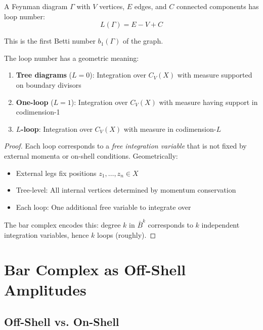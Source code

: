 \begin{definition}
A Feynman diagram $\Gamma$ with $V$ vertices, $E$ edges, and $C$ connected 
components has loop number:
$$L(\Gamma) = E - V + C$$

This is the first Betti number $b_1(\Gamma)$ of the graph.
\end{definition}

\begin{theorem}
The loop number has a geometric meaning:
\begin{enumerate}
\item \textbf{Tree diagrams} ($L=0$): Integration over $C_V(X)$ with measure 
supported on boundary divisors
\item \textbf{One-loop} ($L=1$): Integration over $C_V(X)$ with measure having 
support in codimension-1
\item \textbf{$L$-loop}: Integration over $C_V(X)$ with measure in codimension-$L$
\end{enumerate}
\end{theorem}

\begin{proof}
Each loop corresponds to a \emph{free integration variable} that is not fixed by 
external momenta or on-shell conditions. Geometrically:
\begin{itemize}
\item External legs fix positions $z_1,\ldots,z_n \in X$
\item Tree-level: All internal vertices determined by momentum conservation
\item Each loop: One additional free variable to integrate over
\end{itemize}

The bar complex encodes this: degree $k$ in $\bar{B}^k$ corresponds to $k$ 
independent integration variables, hence $k$ loops (roughly).
\end{proof}

\section{Bar Complex as Off-Shell Amplitudes}

\subsection{Off-Shell vs. On-Shell}

